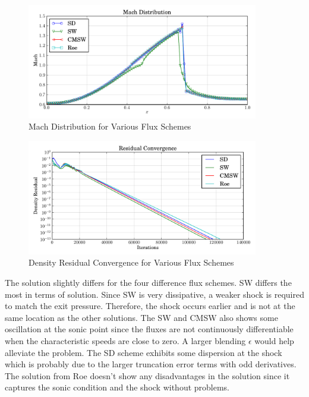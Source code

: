\documentclass[letterpaper,12pt,]{article}
\begin{document}
\begin{figure}[!ht]
    \centering
    \includegraphics[width = 0.9\textwidth]{./figures/q4m.pdf}
    \caption {Mach Distribution for Various Flux Schemes}
    \label{fig:q4m}
\end{figure}
\begin{figure}[!ht]
    \centering
    \includegraphics[width = 0.9\textwidth]{./figures/q4c.pdf}
    \caption {Density Residual Convergence for Various Flux Schemes}
    \label{fig:q4c}
\end{figure}


The solution slightly differs for the four difference flux schemes. SW differs the most in terms of solution.
Since SW is very dissipative, a weaker shock is required to match the exit pressure.
Therefore, the shock occurs earlier and is not at the same location as the other solutions.
The SW and CMSW also shows some oscillation at the sonic point since the fluxes are not continuously differentiable when the characteristic speeds are close to zero.
A larger blending $\epsilon$ would help alleviate the problem.
The SD scheme exhibits some dispersion at the shock which is probably due to the larger truncation error terms with odd derivatives.
The solution from Roe doesn't show any disadvantages in the solution since it captures the sonic condition and the shock without problems.
\end{document}
